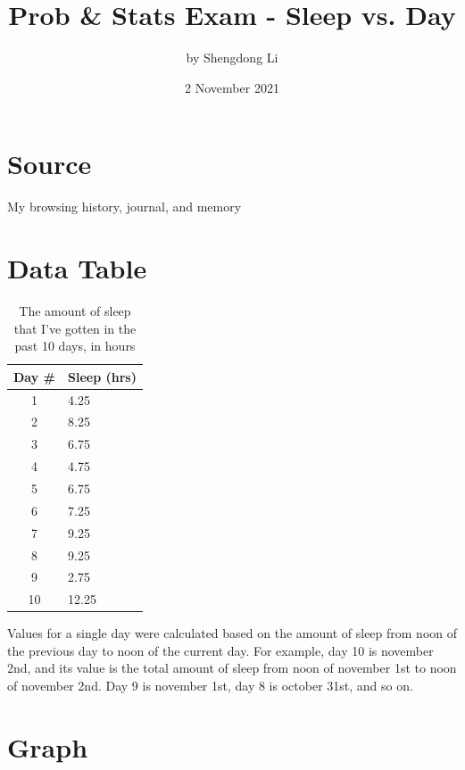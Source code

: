 \documentclass[index]{subfiles}
\begin{document}
\title{Prob \& Stats Exam - Sleep vs. Day}
\author{by Shengdong Li}
\date{2 November 2021}
\maketitle

\section{Source}

My browsing history, journal, and memory

\section{Data Table}

\begin{table}[H]
    \centering
    \caption{The amount of sleep that I've gotten in the past 10 days, in hours}
    \begin{tabularx}{0.20\textwidth}{cX}
        \toprule
        Day \# & Sleep (hrs) \\
        \midrule
        1      & 4.25        \\
        2      & 8.25        \\
        3      & 6.75        \\
        4      & 4.75        \\
        5      & 6.75        \\
        6      & 7.25        \\
        7      & 9.25        \\
        8      & 9.25        \\
        9      & 2.75        \\
        10     & 12.25
    \end{tabularx}
\end{table}

Values for a single day were calculated based on the amount of sleep from noon of the previous day to noon of the current day. For example, day 10 is november 2nd, and its value is the total amount of sleep from noon of november 1st to noon of november 2nd. Day 9 is november 1st, day 8 is october 31st, and so on.

\section{Graph}
\end{document}
